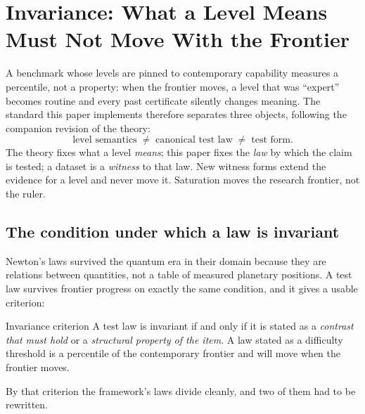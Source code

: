 \documentclass[11pt]{article}
\theoremstyle{definition}
\begin{document}
\section{Invariance: What a Level Means Must Not Move With the Frontier}\label{sec:invariance}

A benchmark whose levels are pinned to contemporary capability measures a percentile, not a property: when the frontier moves, a level that was ``expert'' becomes routine and every past certificate silently changes meaning. The standard this paper implements therefore separates three objects, following the companion revision of the theory:
\[
\text{level semantics} \;\neq\; \text{canonical test law} \;\neq\; \text{test form}.
\]
The theory fixes what a level \emph{means}; this paper fixes the \emph{law} by which the claim is tested; a dataset is a \emph{witness} to that law. New witness forms extend the evidence for a level and never move it. Saturation moves the research frontier, not the ruler.

\subsection{The condition under which a law is invariant}

Newton's laws survived the quantum era in their domain because they are relations between quantities, not a table of measured planetary positions. A test law survives frontier progress on exactly the same condition, and it gives a usable criterion:

\begin{claimbox}{Invariance criterion}
A test law is invariant if and only if it is stated as a \emph{contrast that must hold} or a \emph{structural property of the item}. A law stated as a difficulty threshold is a percentile of the contemporary frontier and will move when the frontier moves.
\end{claimbox}

By that criterion the framework's laws divide cleanly, and two of them had to be rewritten.
\end{document}
